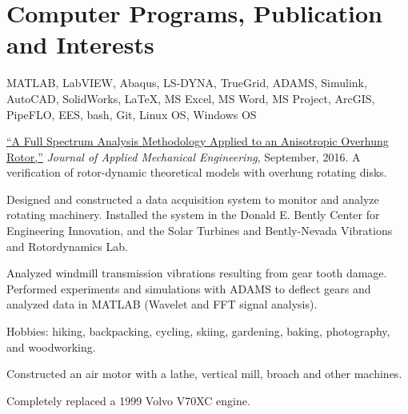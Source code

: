 \documentclass[10pt]{article} %
\begin{document}
\section{Computer Programs, Publication and Interests}
\begin{adjustwidth}{-7pt}{7pt}


	 \footnotesize{MATLAB, LabVIEW, Abaqus, LS-DYNA, TrueGrid, ADAMS, Simulink, AutoCAD, SolidWorks, {\fb \LaTeX}\setmainfont[SmallCapsFont=Fontin SmallCaps]{Fontin-Regular}, MS Excel, MS Word, MS Project, ArcGIS, PipeFLO, EES, bash, Git, Linux OS, Windows OS}\par
	 \footnotesize{ \href{https://www.omicsgroup.org/journals/a-full-spectrum-analysis-methodology-applied-to-an-anisotropic-overhung-rotor-2168-9873-1000232.php?aid=81544}{``A Full Spectrum Analysis Methodology Applied to an Anisotropic Overhung Rotor,''} \textit{Journal of Applied Mechanical Engineering}, September, 2016. A verification of rotor-dynamic theoretical models with overhung rotating disks.}\par
	 \footnotesize{Designed and constructed a data acquisition system to monitor and analyze rotating machinery. Installed the system in the Donald E. Bently Center for Engineering Innovation, and the Solar Turbines and Bently-Nevada Vibrations and Rotordynamics Lab.}\par
	 \footnotesize{Analyzed windmill transmission vibrations resulting from gear tooth damage. Performed experiments and simulations with ADAMS to deflect gears and analyzed data in MATLAB (Wavelet and FFT signal analysis).}\par
	 \footnotesize{Hobbies: hiking, backpacking, cycling, skiing, gardening, baking, photography, and woodworking.}\par
	 \footnotesize{Constructed an air motor with a lathe, vertical mill, broach and other machines.}\par
	 \footnotesize{Completely replaced a 1999 Volvo V70XC engine.}\par



\end{adjustwidth}
\end{document}
